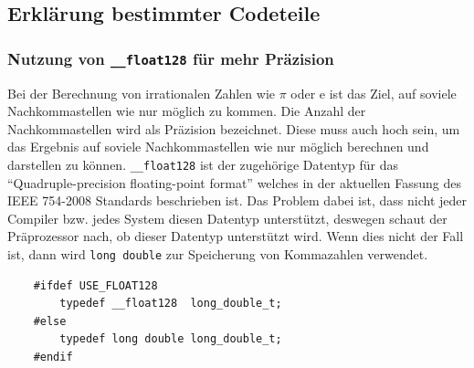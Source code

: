 \documentclass[12pt]{article}
\begin{document}
\subsection{Erklärung bestimmter Codeteile}
\subsubsection{Nutzung von \texttt{\_\_float128} für mehr Präzision}
Bei der Berechnung von irrationalen Zahlen wie $\pi$ oder e ist das Ziel, auf
soviele Nachkommastellen wie nur möglich zu kommen. Die Anzahl der
Nachkommastellen wird als Präzision bezeichnet. Diese muss auch hoch sein,
um das Ergebnis auf soviele Nachkommastellen wie nur möglich berechnen
und darstellen zu können.
\newline
\texttt{\_\_float128} ist der zugehörige Datentyp für das "`Quadruple-precision 
floating-point format"'  welches in der aktuellen Fassung des IEEE 754-2008
\cite{ieee754} Standards beschrieben ist.
\newline
Das Problem dabei ist, dass nicht jeder Compiler bzw. jedes System diesen
Datentyp unterstützt, deswegen schaut der Präprozessor nach, ob dieser Datentyp
unterstützt wird. Wenn dies nicht der Fall ist, dann wird \texttt{long double} 
zur Speicherung von Kommazahlen verwendet.
\begin{verbatim} 
    #ifdef USE_FLOAT128
        typedef __float128  long_double_t;
    #else
        typedef long double long_double_t;
    #endif
\end{verbatim}
\end{document}
